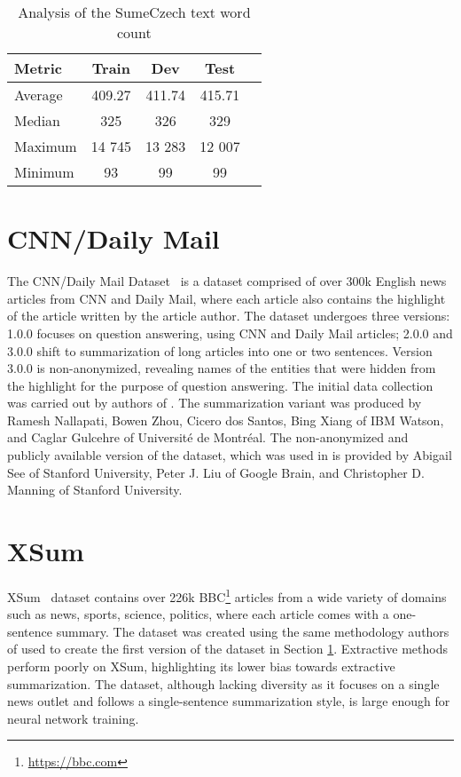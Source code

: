 \documentclass[english, ba, kiv, he, iso690numb, pdf, viewonly]{fasthesis}
\begin{document}
\begin{table}[htbp]
    \centering
    \caption{Analysis of the SumeCzech text word count}
    \label{tab:text_word_count_metrics}
    \begin{tabular}{lcccc}
        \toprule
        \textbf{Metric} & {\textbf{Train}} & {\textbf{Dev}} & {\textbf{Test}} \\
        \midrule
        Average & 409.27 & 411.74 & 415.71 \\
        Median & 325 & 326 & 329 \\
        Maximum & 14 745 & 13 283 & 12 007 \\
        Minimum & 93 & 99 & 99 \\
        \bottomrule
    \end{tabular}
\end{table}

\section{CNN/Daily Mail}\label{cnn/dm}
The CNN/Daily Mail Dataset~\cite{HermannKGEKSB15} is a dataset comprised of over 300k English news articles from CNN and Daily Mail, where each article also contains the highlight of the article written by the article author. The dataset undergoes three versions: 1.0.0 focuses on question answering, using CNN and Daily Mail articles; 2.0.0 and 3.0.0 shift to summarization of long articles into one or two sentences. Version 3.0.0 is non-anonymized, revealing names of the entities that were hidden from the highlight for the purpose of question answering. The initial data collection was carried out by authors of \cite{HermannKGEKSB15}. The summarization variant was produced by Ramesh Nallapati, Bowen Zhou, Cicero dos Santos, Bing Xiang of IBM Watson, and Caglar Gulcehre of Université de Montréal. The non-anonymized and publicly available version of the dataset, which was used in \cite{see-etal-2017-get} is provided by Abigail See of Stanford University, Peter J. Liu of Google Brain, and Christopher D. Manning of Stanford University. 

\section{XSum} \label{sec:xsum}
XSum~\cite{xsum-emnlp} dataset contains over 226k BBC\footnote{\url{https://bbc.com}\label{bbcfootnote}} articles from a wide variety of domains such as news, sports, science, politics, where each article comes with a one-sentence summary. The dataset was created using the same methodology authors of \cite{HermannKGEKSB15} used to create the first version of the dataset in Section \ref{cnn/dm}. Extractive methods perform poorly on XSum, highlighting its lower bias towards extractive summarization. The dataset, although lacking diversity as it focuses on a single news outlet and follows a single-sentence summarization style, is large enough for neural network training.
\end{document}

